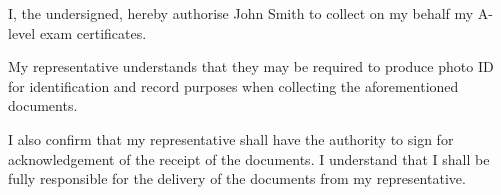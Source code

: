 \documentclass[stdletternofrom]{newlfm}
\begin{document}
  \begin{newlfm}
    I, the undersigned, hereby authorise John Smith to collect on my behalf my
    A-level exam certificates.

    My representative understands that they may be required to produce photo
    ID for identification and record purposes when collecting the
    aforementioned documents.

    I also confirm that my representative shall have the authority to sign for
    acknowledgement of the receipt of the documents. I understand that I
    shall be fully responsible for the delivery of the documents from my
    representative.
  \end{newlfm}
\end{document}
